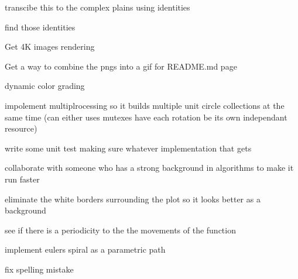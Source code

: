 
\begin{DoxyRefList}
\item[Class \mbox{\hyperlink{classEulersSpiral_1_1EulersSpiral}{Eulers\+Spiral.Eulers\+Spiral}} ]\label{todo__todo000001}%
%
transcibe this to the complex plains using identities 

find those identities  
\item[Namespace \mbox{\hyperlink{namespaceJulia}{Julia}} ]\label{todo__todo000002}%
%
Get 4K images rendering 

Get a way to combine the pngs into a gif for R\+E\+A\+D\+M\+E.\+md page 

dynamic color grading 

impolement multiplrocessing so it builds multiple unit circle collections at the same time (can either uses mutexes have each rotation be its own independant resource) 

write some unit test making sure whatever implementation that gets 

collaborate with someone who has a strong background in algorithms to make it run faster 

eliminate the white borders surrounding the plot so it looks better as a background 

see if there is a periodicity to the the movements of the function 

implement eulers spiral as a parametric path  
\item[Member \mbox{\hyperlink{classJulia_1_1Julia_a966f5090e8ab789ab45b8bbe84435da9}{Julia.Julia.color\+\_\+map\+\_\+\+P\+IL}} (self, itterations\+\_\+til\+\_\+divergence)]\label{todo__todo000003}%
%
fix spelling mistake 
\end{DoxyRefList}